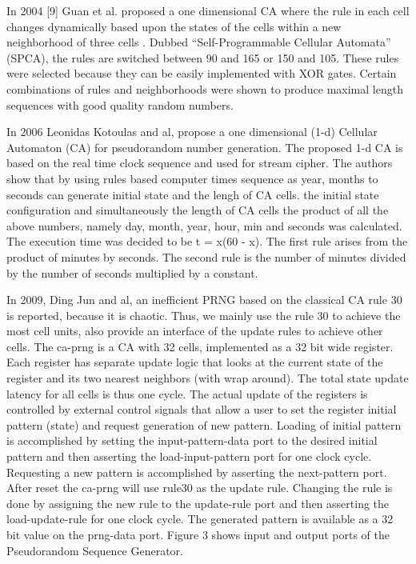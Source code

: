 %

In 2004 [9] Guan et al. proposed a one dimensional CA where the rule in each cell changes dynamically based upon the states of the cells within a new neighborhood of three cells . Dubbed “Self-Programmable Cellular Automata” (SPCA), the rules are switched between 90 and 165 or 150 and 105. These rules were selected because they can be easily implemented with XOR gates. Certain combinations of rules and neighborhoods were shown to produce maximal length sequences with good quality random numbers.

In 2006 Leonidas Kotoulas and al, propose a one dimensional (1-d) Cellular Automaton (CA) for pseudorandom number generation. The proposed 1-d CA is based on the real time clock sequence and used for stream cipher. The authors show that by using rules based computer times sequence as year, months to seconds can generate initial state and the lengh of CA cells. the initial state configuration and simultaneously the length of CA cells the product of all the above numbers, namely day, month, year, hour, min and seconds was calculated. The execution time was decided to be t = x(60 - x). The first rule arises from the product of minutes by seconds. The second rule is the number of minutes divided by the number of seconds multiplied by a constant.

In 2009, Ding Jun and al, an inefficient PRNG based on the classical CA rule 30 is reported, because it is chaotic. Thus, we mainly use the rule 30 to achieve the most cell units, also provide an interface of the update rules to achieve other cells.
The ca-prng is a CA with 32 cells, implemented as a 32 bit wide register. Each register has separate update logic that looks at the current state of the register and its two nearest neighbors (with wrap around). The total state update latency for all cells is thus one cycle. The actual update of the registers is controlled by external control signals that allow a user to set the register initial pattern (state) and request generation of new pattern. Loading of initial pattern is accomplished by setting the input-pattern-data port to the desired initial pattern and then asserting the load-input-pattern port for one clock cycle. Requesting a new pattern is accomplished by asserting the next-pattern port. After reset the ca-prng will use rule30 as the update rule. Changing the rule is done by assigning the new rule to the update-rule port and then asserting the load-update-rule for one clock cycle. The generated pattern is available as a 32 bit value on the prng-data port. Figure 3 shows input and output ports of the Pseudorandom Sequence Generator.

